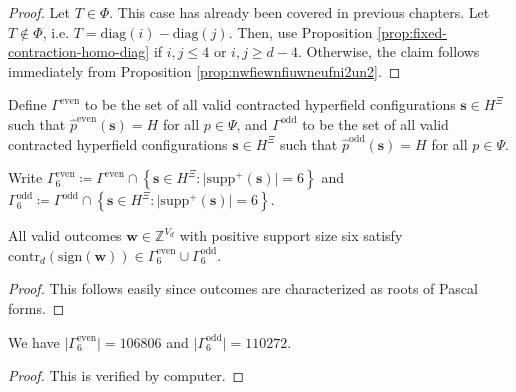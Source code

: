 \begin{proof}
    Let \( T \in \Phi \). This case has already been covered in previous chapters. Let \( T \notin \Phi \), i.e. \( T = \mathrm{diag}(i) - \mathrm{diag}(j) \). Then, use Proposition \ref{prop:fixed-contraction-homo-diag} if \( i,j \leq 4 \) or \( i,j \geq d-4 \). Otherwise, the claim follows immediately from Proposition \ref{prop:nwfiewnfiuwneufni2un2}.
\end{proof}


\begin{definition}
 Define \( \Gamma^{\mathrm{even}} \) to be the set of all valid contracted hyperfield configurations \( \mathbf{s} \in H^{\Xi} \) such that \( \hat p^{\mathrm{even}}(\mathbf{s}) = H \) for all \( p \in \Psi \), and \( \Gamma^{\mathrm{odd}} \) to be the set of all valid contracted hyperfield configurations \( \mathbf{s} \in H^{\Xi} \) such that \( \hat p^{\mathrm{odd}}(\mathbf{s}) = H \) for all \( p \in \Psi \). 

\end{definition}

\begin{definition}
    Write \( \Gamma^{\mathrm{even}}_6 \coloneqq \Gamma^{\mathrm{even}} \cap \left\{ \mathbf{s} \in H^{\Xi} : \lvert \mathrm{supp}^+(\mathbf{s}) \rvert = 6 \right\} \) and \( \Gamma^{\mathrm{odd}}_6 \coloneqq \Gamma^{\mathrm{odd}} \cap \left\{ \mathbf{s} \in H^{\Xi} : \lvert \mathrm{supp}^+(\mathbf{s}) \rvert = 6 \right\} \).

\end{definition}

\begin{proposition}
    All valid outcomes \( \mathbf{w} \in \mathbb{Z}^{V_d} \) with positive support size six satisfy \( \mathrm{contr}_d(\mathrm{sign}(\mathbf{w})) \in \Gamma^{\mathrm{even}}_6 \cup \Gamma^{\mathrm{odd}}_6 \).
\end{proposition}

\begin{proof}
    This follows easily since outcomes are characterized as roots of Pascal forms.
\end{proof}

\begin{proposition}
    We have \( \lvert \Gamma^{\mathrm{even}}_6 \rvert  = 106806\) and \( \lvert \Gamma^{\mathrm{odd}}_6 \rvert  = 110272\).
\end{proposition}

\begin{proof}
    This is verified by computer.
\end{proof}

